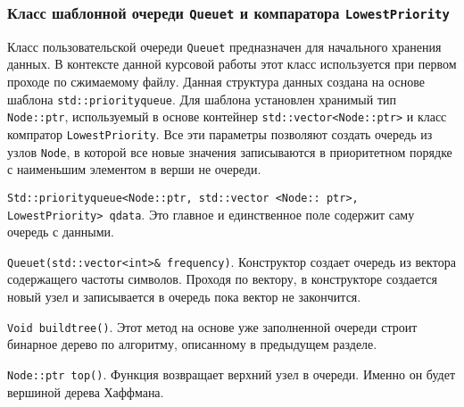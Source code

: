 \subsubsection{Класс шаблонной очереди \texttt{Queue{\textunderscore}t} и компаратора \texttt{LowestPriority}}


Класс пользовательской очереди \texttt{Queue{\textunderscore}t} предназначен для начального хранения данных.
В контексте данной курсовой работы этот класс используется при первом проходе по сжимаемому файлу.
Данная структура данных создана на основе шаблона \texttt{std::priority{\textunderscore}queue}\cite{cpp}.
Для шаблона установлен хранимый тип \texttt{Node::ptr}, используемый в основе контейнер \texttt{std::vector<Node::ptr>} и класс компратор \texttt{LowestPriority}\cite{cpp}.
Все эти параметры позволяют создать очередь из узлов \texttt{Node}, в которой все новые значения записываются в приоритетном порядке с наименьшим элементом в верши не очереди.



\texttt{Std::priority{\textunderscore}queue<Node::ptr, std::vector <Node:: ptr>, LowestPriority> q{\textunderscore}data}.
Это главное и единственное поле содержит саму очередь с данными.



\texttt{Queue{\textunderscore}t(std::vector<int>\& frequency)}.
Конструктор создает очередь из вектора содержащего частоты символов.
Проходя по вектору, в конструкторе создается новый узел и записывается в очередь пока вектор не закончится.



\texttt{Void build{\textunderscore}tree()}.
Этот метод на основе уже заполненной очереди строит бинарное дерево по алгоритму, описанному в предыдущем разделе.



\texttt{Node::ptr top()}.
Функция возвращает верхний узел в очереди. 
Именно он будет вершиной дерева Хаффмана.
